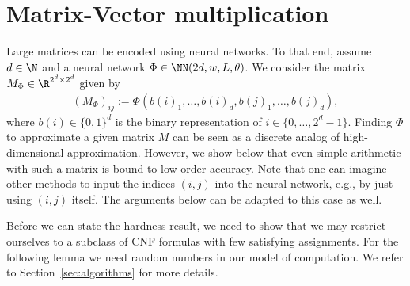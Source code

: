 \documentclass{amsart}[11pt]
\numberwithin{equation}{section}
\numberwithin{theorem}{section}
\begin{document}
\section{Matrix-Vector multiplication}\label{sec:mvm}
    Large matrices can be encoded using neural networks. 
    To that end, assume $d\in\N$ and a neural network $\Phi\in\NN(2d,w,L,\theta)$. We consider the matrix $M_\Phi\in\R^{2^d\times 2^d}$ given by
    \begin{align*}
    (M_{\Phi})_{ij} := \Phi(b(i)_1,\ldots,b(i)_d,b(j)_1,\ldots,b(j)_d),
    \end{align*}
    where $b(i)\in \{0,1\}^d$ is the binary representation of $i\in \{0,\ldots,2^d-1\}$.
    Finding $\Phi$ to approximate a given matrix $M$ can be seen as a discrete analog of high-dimensional approximation. 
    However, we show below that even simple arithmetic with such a matrix is bound to low order accuracy. Note that one can imagine other methods to input the indices $(i,j)$ into the neural network, e.g., by just using $(i,j)$ itself. The arguments below can be adapted to this case as well.

    Before we can state the hardness result, we need to show that we may restrict ourselves to a subclass of CNF formulas with few satisfying assignments. For the following lemma we need random numbers in our model of computation. We refer to Section~\ref{sec:algorithms} for more details.
\end{document}
